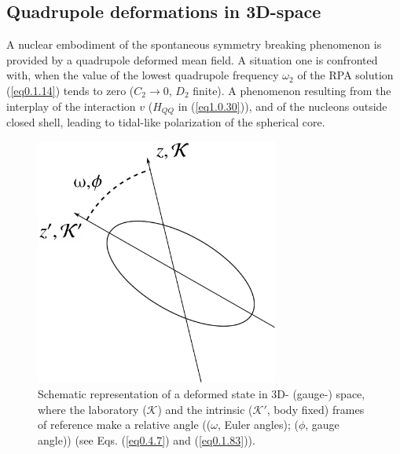 \subsection{Quadrupole deformations in 3D-space}
A nuclear embodiment of the spontaneous symmetry breaking phenomenon is provided by a quadrupole deformed  mean field. A situation one is confronted with, when the value of the lowest quadrupole frequency $\omega_2$ of the RPA solution (\ref{eq0.1.14}) tends to zero ($C_2\to0$, $D_2$ finite). A phenomenon resulting from the interplay of the interaction $v$ ($H_{QQ}$ in (\ref{eq1.0.30})), and of the nucleons outside closed shell, leading to tidal-like polarization of the spherical core.
\begin{figure}
	\centerline {
		\includegraphics*[width=8cm, angle=0.]{introduccion/figs/fig0_4_4}
	}
	\caption{Schematic representation of a deformed state in  3D- (gauge-) space, where the laboratory ($\mathcal K$) and the intrinsic ($\mathcal K'$, body fixed) frames of reference make a relative  angle (($\omega$, Euler angles); ($\phi$, gauge angle))  (see Eqs. (\ref{eq0.4.7}) and (\ref{eq0.1.83})).}
	\label{fig0.4.4}
\end{figure}
